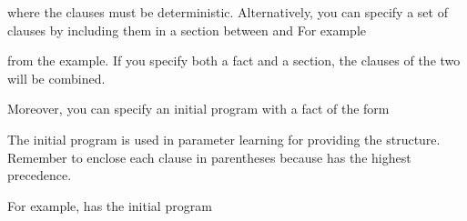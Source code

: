 \documentclass[letterpaper,10pt,english]{sphinxmanual}
\begin{document}
\sphinxAtStartPar
where the clauses must be deterministic.
Alternatively, you can specify a set of clauses by including them in a section between  and 
For example

\begin{sphinxVerbatim}[commandchars=\\\{\}]
 

 
 

 
\end{sphinxVerbatim}

\sphinxAtStartPar
from the  example.
If you specify both a  fact and a section, the clauses of the two will be combined.

\sphinxAtStartPar
Moreover, you can specify an initial program with a fact of the form

\begin{sphinxVerbatim}[commandchars=\\\{\}]
    
\end{sphinxVerbatim}

\sphinxAtStartPar
The initial program is used in parameter learning for providing the structure.
Remember to enclose each clause in parentheses because \sphinxcode{\sphinxupquote{:\sphinxhyphen{}}} has the highest precedence.

\sphinxAtStartPar
For example,  has the initial program
\end{document}
